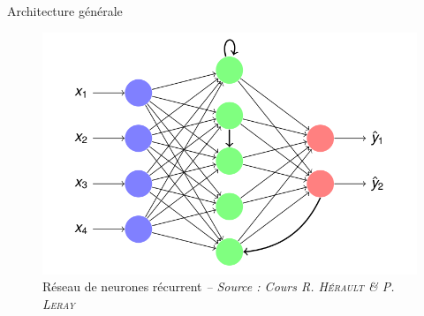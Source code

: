 \begin{frame}{Architecture générale}
    \begin{figure}
        \includegraphics[height=.75\textheight,width=\textwidth,keepaspectratio]{images/arch_rnn_1}
        \caption{Réseau de neurones récurrent {\scriptsize\it -- Source : Cours R. \textsc{Hérault} \& P. \textsc{Leray}}}
    \end{figure}

\end{frame}

